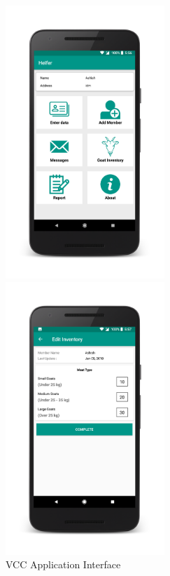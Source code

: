 \documentclass[11pt]{article}
\begin{document}
\begin{figure}[!h]
  \caption{VCC Application Interface}
  \label{fig:app}
  \begin{minipage}{.2\textwidth}
    \includegraphics[width=6cm]{vcc1.png}
  \end{minipage}
  \hspace{1.5cm}
  \begin{minipage}{.2\textwidth}
    \includegraphics[width=6cm]{vcc2.png}
  \end{minipage}
  \hspace{1.5cm}
  \begin{minipage}{.2\textwidth}

\end{minipage}
\end{figure}
\end{document}
